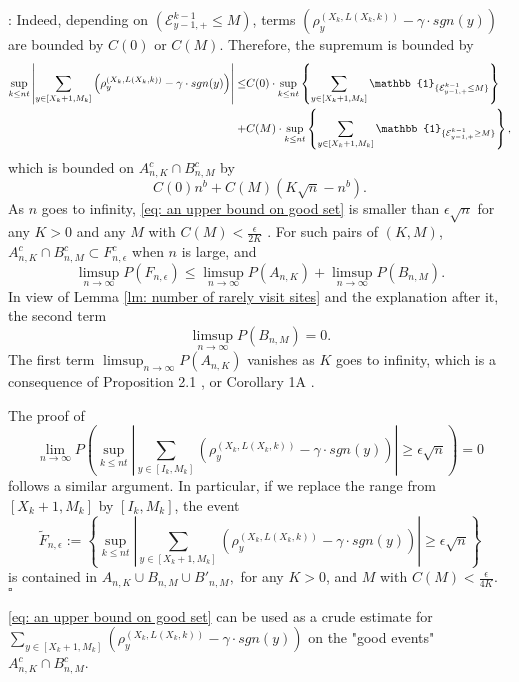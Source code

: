 \documentclass[twoside,12pt,a4paper]{article}
\numberwithin{equation}{section}
\newenvironment{proof}[1][Proof]{{\sc #1}:}{~\hfill $\square$}
\newcommand{\abs}[1]{\left\vert #1 \right\vert}
\begin{document}
\begin{proof}
	Indeed, depending on $(\mathcal{E}^{k-1}_{y-1,+} \leq M)$, terms  $\left( \rho^{(X_k,L(X_k,k))}_y -  \gamma \cdot sgn(y) \right)$ are bounded by $C(0)$ or $C(M)$. Therefore, the supremum is bounded by
	\begin{align*}
	 \sup_{k\leq n t}  \abs{  	\sum_{y\in [X_{k}+1 ,M_k]} \left( \rho^{(X_k,L(X_k,k))}_y -  \gamma \cdot sgn(y) \right) } \leq &  
	 C(0) \cdot \sup_{k\leq n t} \left\{   	\sum_{y\in [X_{k}+1 ,M_k]} \mathbb{1}_{ \{ \mathcal{E}^{k-1}_{y-1,+} \leq M \} } \right\}
	 \notag
	 \\
	 +& C(M) \cdot \sup_{k\leq n t} \left\{   	\sum_{y\in [X_{k}+1 ,M_k]} \mathbb{1}_{ \{ \mathcal{E}^{k-1}_{y-1,+} \geq M \} } \right\},
\end{align*} which is bounded on $A^c_{n,K} \cap B^c_{n,M}$ by
\begin{equation}\label{eq: an upper bound on good set}
	C(0)n^b  + C(M) \left(K \sqrt{n} -n^b\right).
\end{equation} As $n$ goes to infinity, \eqref{eq: an upper bound on good set} is smaller than $\epsilon \sqrt{n}$ for any $K>0$ and any $M$ with $C(M) < \frac{\epsilon}{2K}$ . 
For such pairs of $(K,M)$, $A^c_{n,K} \cap B^c_{n,M} \subset F^c_{n,\epsilon}$ when $n$ is large,  and 
$$
\limsup_{n\to \infty} P(F_{n,\epsilon}) \leq \limsup_{n\to \infty}  P(A_{n,K}) +  \limsup_{n\to \infty}  P(B_{n,M}).
$$ In view of Lemma \ref{lm: number of rarely visit sites} and the explanation after it, the second term $$\limsup_{n\to \infty}  P(B_{n,M})=0.$$  The first term $\limsup_{n\to \infty}  P(A_{n,K}) $ vanishes as $K$ goes to infinity, which is a consequence of Proposition 2.1 \cite{KMP22}, or Corollary 1A \cite{T96}.
 
The proof of 
$$  
\lim_{n\to\infty} P\left( \sup_{k\leq n t}  \abs{  	\sum_{y\in [I_k ,M_k]} \left( \rho^{(X_k,L(X_k,k))}_y -  \gamma \cdot sgn(y) \right) } \geq  \epsilon \sqrt{n}     \right) =0
$$ 
follows a similar argument. In particular, if we replace the range from $[X_k+1, M_k]$ by $[I_k,M_k]$, the event 
$$
\tilde{F}_{n,\epsilon}:= \left\{ \sup_{k\leq n t}  \abs{  	\sum_{y\in [X_{k}+1 ,M_{k}]} \left( \rho^{(X_k,L(X_k,k))}_y -  \gamma \cdot sgn(y) \right) } \geq  \epsilon \sqrt{n}    \right \}
$$ 
is contained in $A_{n,K} \cup B_{n,M} \cup  B'_{n,M},$ for any $K>0$, and $M$ with $C(M) < \frac{\epsilon}{4K}$.
\end{proof}

\eqref{eq: an upper bound on good set} can be used as a crude estimate for 	$\sum_{y\in [X_{k}+1 ,M_{k}]} \left( \rho^{(X_k,L(X_k,k))}_y -  \gamma \cdot sgn(y) \right)$   on the "good events" $A^c_{n,K}\cap B^c_{n,M}$.
\end{document}
